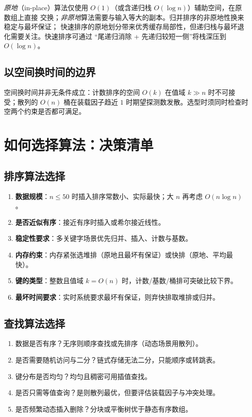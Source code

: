 \emph{原地}（in-place）算法仅使用 $O(1)$（或含递归栈 $O(\log n)$）辅助空间，在原数组上直接
交换；\emph{非原地}算法需要与输入等大的副本。归并排序的非原地性换来稳定与最坏保证；
快速排序的原地划分带来优秀缓存局部性，但递归栈与最坏退化需要关注。快速排序可通过
“尾递归消除 + 先递归较短一侧”将栈深压到 $O(\log n)$。

\subsection{以空间换时间的边界}

空间换时间并非无条件成立：计数排序的空间 $O(k)$ 在值域 $k\gg n$ 时不可接受；散列的 $O(n)$
桶在装载因子趋近 $1$ 时期望探测数发散。选型时须同时检查时空两个约束是否都可满足。

\section{如何选择算法：决策清单}

\subsection{排序算法选择}

\begin{enumerate}
    \item \textbf{数据规模}：$n\le 50$ 时插入排序常数小、实际最快；大 $n$ 再考虑 $O(n\log n)$。
    \item \textbf{是否近似有序}：接近有序时插入或希尔接近线性。
    \item \textbf{稳定性要求}：多关键字场景优先归并、插入、计数与基数。
    \item \textbf{内存约束}：内存紧张选堆排（原地且最坏有保证）或快排（原地、平均最快）。
    \item \textbf{键的类型}：整数且值域 $k=O(n)$ 时，计数/基数/桶排可突破比较下界。
    \item \textbf{最坏时间要求}：实时系统要求最坏有保证，则弃快排取堆排或归并。
\end{enumerate}

\subsection{查找算法选择}

\begin{enumerate}
    \item 数据是否有序？无序则顺序查找或先排序（动态场景用散列）。
    \item 是否需要随机访问与二分？链式存储无法二分，只能顺序或转跳表。
    \item 键分布是否均匀？均匀且稠密可用插值查找。
    \item 是否只需等值查询？是则散列最优，但要评估装载因子与冲突处理。
    \item 是否频繁动态插入删除？分块或平衡树优于静态有序数组。
\end{enumerate}

